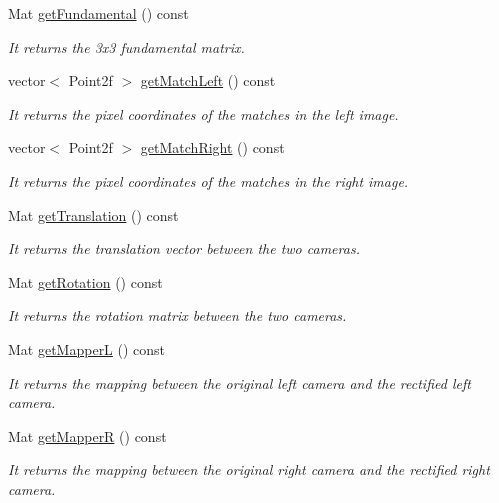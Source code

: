\begin{DoxyCompactItemize}
Mat \hyperlink{classStereoCamera_a57235f5bf074b5cd96d75d0d1662c26c}{get\+Fundamental} () const 
\begin{DoxyCompactList}\small\item\em It returns the 3x3 fundamental matrix. \end{DoxyCompactList}\item 
vector$<$ Point2f $>$ \hyperlink{classStereoCamera_a42908347f3f8457e4569a9e6b7e19118}{get\+Match\+Left} () const 
\begin{DoxyCompactList}\small\item\em It returns the pixel coordinates of the matches in the left image. \end{DoxyCompactList}\item 
vector$<$ Point2f $>$ \hyperlink{classStereoCamera_a24e61743d392be57d4d2e5b88e55abd1}{get\+Match\+Right} () const 
\begin{DoxyCompactList}\small\item\em It returns the pixel coordinates of the matches in the right image. \end{DoxyCompactList}\item 
Mat \hyperlink{classStereoCamera_ae914424daf5b615dea6d7d09921f0b19}{get\+Translation} () const 
\begin{DoxyCompactList}\small\item\em It returns the translation vector between the two cameras. \end{DoxyCompactList}\item 
Mat \hyperlink{classStereoCamera_a2baf8c2d797f2ae0d7d00d8e41250db0}{get\+Rotation} () const 
\begin{DoxyCompactList}\small\item\em It returns the rotation matrix between the two cameras. \end{DoxyCompactList}\item 
Mat \hyperlink{classStereoCamera_aa1b2b60fa8d72cb8928e8db58842e65f}{get\+Mapper\+L} () const 
\begin{DoxyCompactList}\small\item\em It returns the mapping between the original left camera and the rectified left camera. \end{DoxyCompactList}\item 
Mat \hyperlink{classStereoCamera_aceec69a43430b8445e66e907a179e57e}{get\+Mapper\+R} () const 
\begin{DoxyCompactList}\small\item\em It returns the mapping between the original right camera and the rectified right camera. \end{DoxyCompactList}\item 

\end{DoxyCompactItemize}
